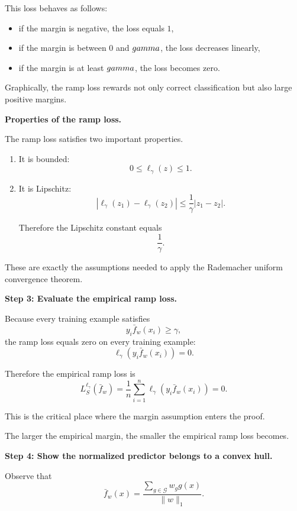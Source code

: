 \documentclass[11pt]{article}
\begin{document}
\begin{enumerate}
\begin{solutionbox}
This loss behaves as follows:
\begin{itemize}
    \item if the margin is negative, the loss equals $1$,
    \item if the margin is between $0$ and $\\gamma$, the loss decreases linearly,
    \item if the margin is at least $\\gamma$, the loss becomes zero.
\end{itemize}

Graphically, the ramp loss rewards not only correct classification but also large positive margins.

\medskip

\textbf{Properties of the ramp loss.}

The ramp loss satisfies two important properties.

\begin{enumerate}
    \item It is bounded:
    \[
    0\le\ell_\gamma(z)\le1.
    \]

    \item It is Lipschitz:
    \[
    |\ell_\gamma(z_1)-\ell_\gamma(z_2)|
    \le
    \frac1\gamma|z_1-z_2|.
    \]

    Therefore the Lipschitz constant equals
    \[
    \frac1\gamma.
    \]
\end{enumerate}

These are exactly the assumptions needed to apply the Rademacher uniform convergence theorem.

\medskip

\textbf{Step 3: Evaluate the empirical ramp loss.}

Because every training example satisfies
\[
y_i\bar f_w(x_i)\ge\gamma,
\]
the ramp loss equals zero on every training example:
\[
\ell_\gamma(y_i\bar f_w(x_i))=0.
\]

Therefore the empirical ramp loss is
\[
L_S^{\ell_\gamma}(\bar f_w)
=
\frac1n
\sum_{i=1}^n
\ell_\gamma(y_i\bar f_w(x_i))
=
0.
\]

This is the critical place where the margin assumption enters the proof.

The larger the empirical margin, the smaller the empirical ramp loss becomes.

\medskip

\textbf{Step 4: Show the normalized predictor belongs to a convex hull.}

Observe that
\[
\bar f_w(x)
=
\frac{
\sum_{g\in\mathcal G}w_gg(x)
}{
\|w\|_1
}.
\]


\end{solutionbox}
\end{enumerate}
\end{document}
